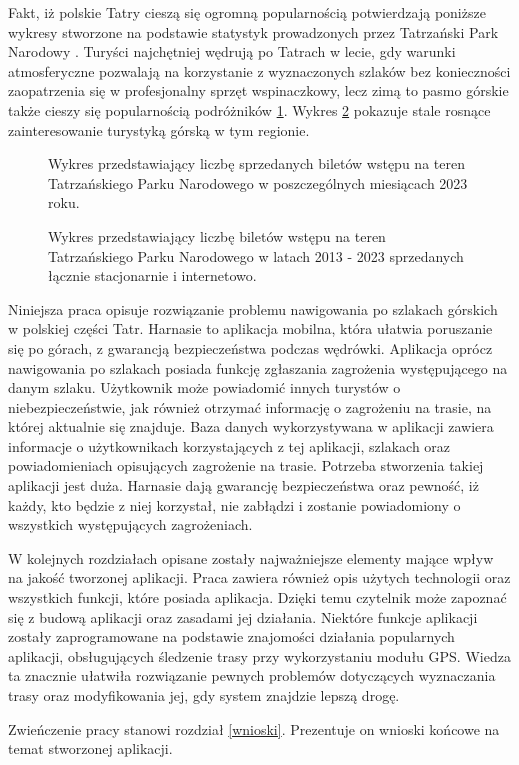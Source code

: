 Fakt, iż polskie Tatry cieszą się ogromną popularnością potwierdzają poniższe wykresy stworzone na podstawie statystyk prowadzonych przez Tatrzański Park Narodowy \cite{tpnstat}. Turyści najchętniej wędrują po Tatrach w lecie, gdy warunki atmosferyczne pozwalają na korzystanie z wyznaczonych szlaków bez konieczności zaopatrzenia się w profesjonalny sprzęt wspinaczkowy, lecz zimą to pasmo górskie także cieszy się popularnością podróżników \ref{sprzedaz2023}. Wykres \ref{sprzedaz} pokazuje stale rosnące zainteresowanie turystyką górską w tym regionie. 

\begin{figure}[H]
    \centering
    \caption{Wykres przedstawiający liczbę sprzedanych biletów wstępu na teren Tatrzańskiego Parku Narodowego w poszczególnych miesiącach 2023 roku.
}
    \label{sprzedaz2023}
\end{figure}

\begin{figure}[H]
    \centering
    \caption{Wykres przedstawiający liczbę biletów wstępu na teren Tatrzańskiego Parku Narodowego w latach 2013 - 2023 sprzedanych łącznie stacjonarnie i internetowo.}
    \label{sprzedaz}
\end{figure}
 
Niniejsza praca opisuje rozwiązanie problemu nawigowania po szlakach górskich w polskiej części Tatr. Harnasie to aplikacja mobilna, która ułatwia poruszanie się po górach, z gwarancją bezpieczeństwa podczas wędrówki. Aplikacja oprócz nawigowania po szlakach posiada funkcję zgłaszania zagrożenia występującego na danym szlaku. Użytkownik może powiadomić innych turystów o niebezpieczeństwie, jak również otrzymać informację o zagrożeniu na trasie, na której aktualnie się znajduje. Baza danych wykorzystywana w aplikacji zawiera informacje o użytkownikach korzystających z tej aplikacji, szlakach oraz powiadomieniach opisujących zagrożenie na trasie. Potrzeba stworzenia takiej aplikacji jest duża. Harnasie dają gwarancję bezpieczeństwa oraz pewność, iż każdy, kto będzie z niej korzystał, nie zabłądzi i zostanie powiadomiony o wszystkich występujących zagrożeniach.

W kolejnych rozdziałach opisane zostały najważniejsze elementy mające wpływ na jakość tworzonej aplikacji. Praca zawiera również opis użytych technologii oraz wszystkich funkcji, które posiada aplikacja. Dzięki temu czytelnik może zapoznać się z budową aplikacji oraz zasadami jej działania. Niektóre funkcje aplikacji zostały zaprogramowane na podstawie znajomości działania popularnych aplikacji, obsługujących śledzenie trasy przy wykorzystaniu modułu GPS. Wiedza ta znacznie ułatwiła rozwiązanie pewnych problemów dotyczących wyznaczania trasy oraz modyfikowania jej, gdy system znajdzie lepszą drogę.

Zwieńczenie pracy stanowi rozdział \ref{wnioski}. Prezentuje on wnioski końcowe na temat stworzonej aplikacji.

\newpage
